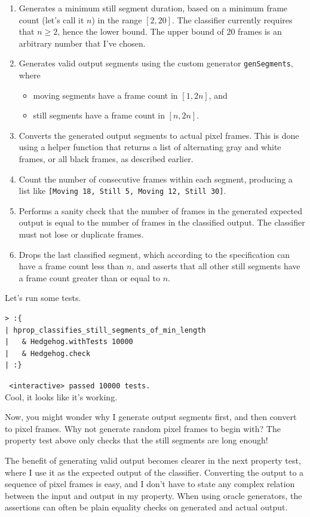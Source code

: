 \begin{enumerate}
\item Generates a minimum still segment duration, based on a minimum frame count (let's call it $n$) in the range 
$[2,20]$. The classifier currently requires that $n \geq 2$, hence the lower bound. The upper bound of 20 frames is an arbitrary number that I've chosen.
\item Generates valid output segments using the custom generator \texttt{genSegments}, where
\begin{itemize}
\item moving segments have a frame count in $[1,2n]$, and
\item still segments have a frame count in $[n,2n]$.
\end{itemize}
\item Converts the generated output segments to actual pixel frames. This is done using a helper function that returns a list of alternating gray and white frames, or all black frames, as described earlier.
\item Count the number of consecutive frames within each segment, producing a list like \texttt{[Moving 18, Still 5, Moving 12, Still 30]}.
\item Performs a sanity check that the number of frames in the generated expected output is equal to the number of frames in the classified output. The classifier must not lose or duplicate frames.
\item Drops the last classified segment, which according to the specification can have a frame count less than $n$, and asserts that all other still segments have a frame count greater than or equal to $n$. 
\end{enumerate}
Let's run some tests.

\begin{verbatim}
> :{
| hprop_classifies_still_segments_of_min_length
|   & Hedgehog.withTests 10000
|   & Hedgehog.check
| :}
\end{verbatim}
\texttt{  \checkmark <interactive> passed 10000 tests.}\\
Cool, it looks like it's working.


Now, you might wonder why I generate output segments first, and then convert to pixel frames. Why not generate random pixel frames to begin with? The property test above only checks that the still segments are long enough!

The benefit of generating valid output becomes clearer in the next property test, where I use it as the expected output of the classifier. Converting the output to a sequence of pixel frames is easy, and I don't have to state any complex relation between the input and output in my property. When using oracle generators, the assertions can often be plain equality checks on generated and actual output.


